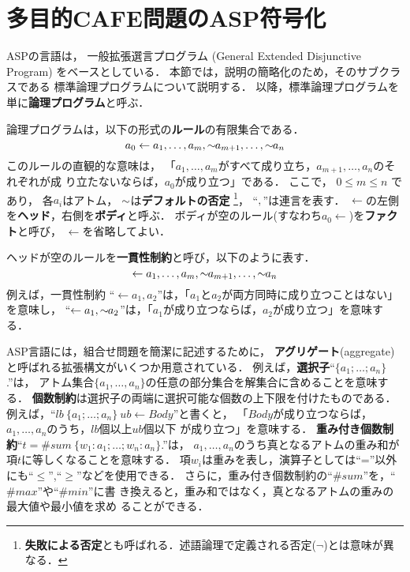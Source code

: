 \section{多目的CAFE問題のASP符号化}\label{sec:proposal}

ASPの言語は，
一般拡張選言プログラム
(General Extended Disjunctive Program)
をベースとしている\cite{Inoue08:jssst}．
本節では，説明の簡略化のため，そのサブクラスである
標準論理プログラムについて説明する．
以降，標準論理プログラムを単に{\bf 論理プログラム}と呼ぶ．

論理プログラムは，以下の形式の\textbf{ルール}の有限集合である．
\begin{equation}
  \label{eq:rule}
  a_0\leftarrow a_1,\dots,a_m,{\sim\!\!{a_{m+1}}},\dots,{\sim\!\!{a_n}}
\end{equation}
このルールの直観的な意味は，
「$a_1,\ldots,a_m$がすべて成り立ち，$a_{m+1},\ldots,a_n$のそれぞれが成
り立たないならば，$a_0$が成り立つ」である．
ここで，
$0\leq m\leq n$ であり，
各$a_i$はアトム，
${\sim\!\!{}}$は\textbf{デフォルトの否定}
\footnote{\textbf{失敗による否定}とも呼ばれる．述語論理で定義される否定($\neg$)とは意味が異なる．}，
``$,$''は連言を表す．
$\leftarrow$の左側を\textbf{ヘッド}，右側を\textbf{ボディ}と呼ぶ．
ボディが空のルール(すなわち\(a_0\leftarrow\))を\textbf{ファクト}と呼び，
$\leftarrow$を省略してよい．

ヘッドが空のルールを\textbf{一貫性制約}と呼び，以下のように表す．
\begin{equation}
  \label{eq:constr}
  \leftarrow a_1,\dots,a_m,{\sim\!\!{a_{m+1}}},\dots,{\sim\!\!{a_n}}
\end{equation}
例えば，一貫性制約
``\(\leftarrow a_1,a_2\)''は，「$a_1$と$a_2$が両方同時に成り立つことはない」を意味し，
``\(\leftarrow a_1, {\sim\!\!{a_{2}}}\)''は，「$a_1$が成り立つならば，$a_2$が成り立つ」を意味する．

ASP言語には，組合せ問題を簡潔に記述するために，
\textbf{アグリゲート}(aggregate)と呼ばれる拡張構文がいくつか用意されている．
例えば，\textbf{選択子}``$\{a_1;\ldots;a_n\}$.''は，
アトム集合\(\{a_1,\ldots,a_n\}\)の任意の部分集合を解集合に含めることを意味する．
\textbf{個数制約}は選択子の両端に選択可能な個数の上下限を付けたものである．
例えば，``\(lb\ \{a_1;\dots;a_n\}\ ub \leftarrow Body\)''と書くと，
「$Body$が成り立つならば，$a_1,\dots,a_n$のうち，$lb$個以上$ub$個以下
が成り立つ」を意味する．
\textbf{重み付き個数制約}``\(t = \#sum\ \{w_1:a_1;\ldots;w_n:a_n\}\).''は，
$a_1,\dots,a_n$のうち真となるアトムの重み和が項$t$に等しくなることを意味する．
項$w_i$は重みを表し，演算子としては``=''以外にも``$\leq$'',``$\geq$''などを使用できる．
さらに，重み付き個数制約の``$\#sum$''を，``$\#max$''や``$\#min$''に書
き換えると，重み和ではなく，真となるアトムの重みの最大値や最小値を求め
ることができる．

